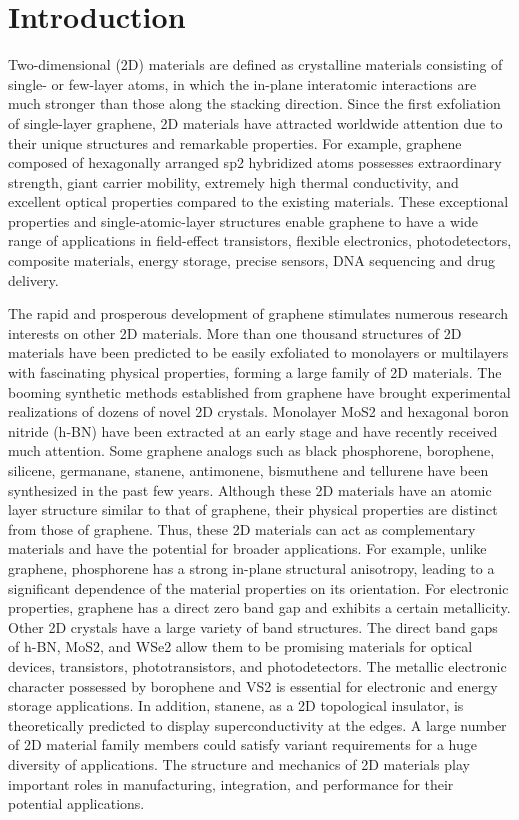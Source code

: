 \documentclass[12pt,a4paper]{report}
\begin{document}
\section{Introduction}
Two-dimensional (2D) materials are defined as crystalline materials consisting of single- or few-layer atoms, in which the in-plane interatomic interactions are much stronger than those along the stacking direction. Since the first exfoliation of single-layer graphene, 2D materials have attracted worldwide attention due to their unique structures and remarkable properties. For example, graphene composed of hexagonally arranged sp2 hybridized atoms possesses extraordinary strength, giant carrier mobility, extremely high thermal conductivity, and excellent optical properties compared to the existing materials. These exceptional properties and single-atomic-layer structures enable graphene to have a wide range of applications in field-effect transistors, flexible electronics, photodetectors, composite materials, energy storage, precise sensors, DNA sequencing and drug delivery.

The rapid and prosperous development of graphene stimulates numerous research interests on other 2D materials. More than one thousand structures of 2D materials have been predicted to be easily exfoliated to monolayers or multilayers with fascinating physical properties, forming a large family of 2D materials. The booming synthetic methods established from graphene have brought experimental realizations of dozens of novel 2D crystals. Monolayer MoS2 and hexagonal boron nitride (h-BN) have been extracted at an early stage and have recently received much attention. Some graphene analogs such as black phosphorene, borophene, silicene, germanane, stanene, antimonene, bismuthene and tellurene have been synthesized in the past few years. Although these 2D materials have an atomic layer structure similar to that of graphene, their physical properties are distinct from those of graphene. Thus, these 2D materials can act as complementary materials and have the potential for broader applications. For example, unlike graphene, phosphorene has a strong in-plane structural anisotropy, leading to a significant dependence of the material properties on its orientation. For electronic properties, graphene has a direct zero band gap and exhibits a certain metallicity. Other 2D crystals have a large variety of band structures. The direct band gaps of h-BN, MoS2, and WSe2 allow them to be promising materials for optical devices, transistors, phototransistors, and photodetectors. The metallic electronic character possessed by borophene and VS2 is essential for electronic and energy storage applications. In addition, stanene, as a 2D topological insulator, is theoretically predicted to display superconductivity at the edges. A large number of 2D material family members could satisfy variant requirements for a huge diversity of applications. The structure and mechanics of 2D materials play important roles in manufacturing, integration, and performance for their potential applications.
\end{document}
